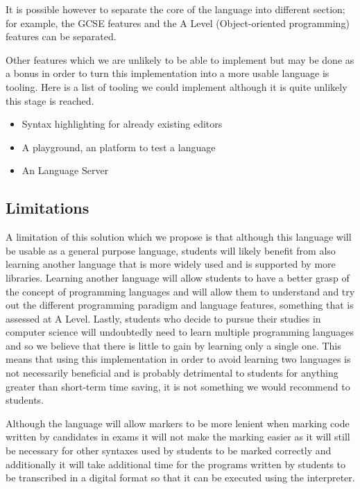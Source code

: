 \documentclass{article}
\begin{document}
It is possible however to separate the core of the language into different
section; for example, the GCSE features and the A Level (Object-oriented
programming) features can be separated.

Other features which we are unlikely to be able to implement but may be done as
a bonus in order to turn this implementation into a more usable language is
tooling. Here is a list of tooling we could implement although it is quite
unlikely this stage is reached.

\begin{itemize}
    \item{Syntax highlighting for already existing editors}
    \item{A playground, an platform to test a language}
    \item{An Language Server}
\end{itemize}

\subsection{Limitations}


A limitation of this solution which we propose is that although this language
will be usable as a general purpose language, students will likely benefit from
also learning another language that is more widely used and is supported by
more libraries. Learning another language will allow students to have a better
grasp of the concept of programming languages and will allow them to understand
and try out the different programming paradigm and language features, something
that is assessed at A Level. Lastly, students who decide to pursue their
studies in computer science will undoubtedly need to learn multiple programming
languages and so we believe that there is little to gain by learning only a
single one. This means that using this implementation in order to avoid
learning two languages is not necessarily beneficial and is probably
detrimental to students for anything greater than short-term time saving, it is
not something we would recommend to students.

Although the language will allow markers to be more lenient when marking code
written by candidates in exams it will not make the marking easier as it will
still be necessary for other syntaxes used by students to be marked correctly
and additionally it will take additional time for the programs written by
students to be transcribed in a digital format so that it can be executed using
the interpreter.
\end{document}
